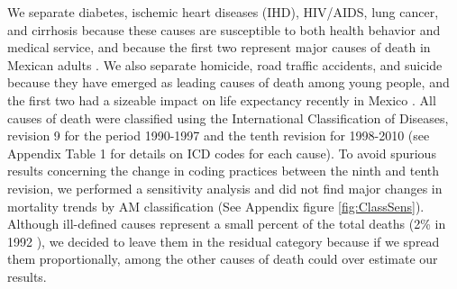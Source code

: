 \documentclass[11.5pt]{article}
\begin{document}
\begin{spacing}{1.5}

We separate diabetes, ischemic heart diseases (IHD), HIV/AIDS, lung
cancer, and cirrhosis because these causes are susceptible to both health behavior
and medical service, and because the first two represent major causes of death
in Mexican adults \citep{canudas2014}. We also separate
homicide, road traffic accidents, and suicide because they have emerged as
leading causes of death among young people, and the first two had a sizeable
impact on life expectancy recently in Mexico \citep{canudas2014}. All causes of death were classified using the International Classification of Diseases, revision 9 for the period 1990-1997 and the tenth revision for 1998-2010 (see Appendix Table 1 for details on ICD codes for each cause). To avoid spurious results concerning the change in coding practices between the ninth and tenth revision, we performed a sensitivity analysis and did not find major changes in mortality trends by AM classification (See Appendix figure \ref{fig:ClassSens}). Although ill-defined causes represent a small percent of the total deaths (2\% in 1992 \citep{rivera2002epidemiological}), we decided to leave them in the residual category because if we spread them proportionally,  among the other causes of death could over estimate our results.


\end{spacing}
\end{document}
